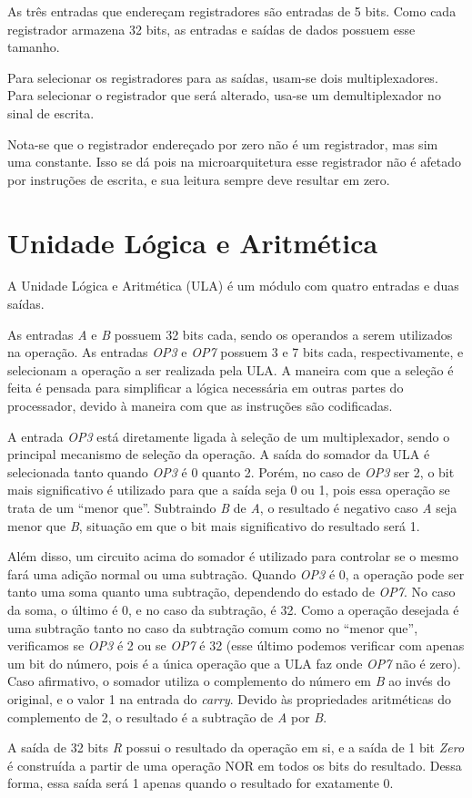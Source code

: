\documentclass[twocolumn]{article}
\newcommand{\circuit}[1]{}
\begin{document}
As três entradas que endereçam registradores são entradas de 5 bits. Como cada
registrador armazena 32 bits, as entradas e saídas de dados possuem esse
tamanho.

Para selecionar os registradores para as saídas, usam-se dois
multiplexadores. Para selecionar o registrador que será alterado, usa-se um
demultiplexador no sinal de escrita.

Nota-se que o registrador endereçado por zero não é um registrador, mas sim uma
constante. Isso se dá pois na microarquitetura esse registrador não é afetado
por instruções de escrita, e sua leitura sempre deve resultar em zero.

\section{Unidade Lógica e Aritmética}

A Unidade Lógica e Aritmética (ULA) é um módulo com quatro entradas e duas
saídas.

\circuit{alu}

As entradas \textit{A} e \textit{B} possuem 32 bits cada, sendo os operandos a
serem utilizados na operação. As entradas \textit{OP3} e \textit{OP7} possuem 3
e 7 bits cada, respectivamente, e selecionam a operação a ser realizada pela
ULA. A maneira com que a seleção é feita é pensada para simplificar a lógica
necessária em outras partes do processador, devido à maneira com que as
instruções são codificadas.

A entrada \textit{OP3} está diretamente ligada à seleção de um multiplexador,
sendo o principal mecanismo de seleção da operação. A saída do somador da ULA é
selecionada tanto quando \textit{OP3} é 0 quanto 2. Porém, no caso de
\textit{OP3} ser 2, o bit mais significativo é utilizado para que a saída seja 0
ou 1, pois essa operação se trata de um ``menor que''. Subtraindo \textit{B} de
\textit{A}, o resultado é negativo caso \textit{A} seja menor que \textit{B},
situação em que o bit mais significativo do resultado será 1.

Além disso, um circuito acima do somador é utilizado para controlar se o mesmo
fará uma adição normal ou uma subtração. Quando \textit{OP3} é 0, a operação
pode ser tanto uma soma quanto uma subtração, dependendo do estado de
\textit{OP7}. No caso da soma, o último é 0, e no caso da subtração, é 32. Como
a operação desejada é uma subtração tanto no caso da subtração comum como no
``menor que'', verificamos se \textit{OP3} é 2 ou se \textit{OP7} é 32 (esse
último podemos verificar com apenas um bit do número, pois é a única operação
que a ULA faz onde \textit{OP7} não é zero). Caso afirmativo, o somador utiliza
o complemento do número em \textit{B} ao invés do original, e o valor 1 na
entrada do \textit{carry}. Devido às propriedades aritméticas do complemento de
2\cite{cornell-notes}, o resultado é a subtração de \textit{A} por \textit{B}.

A saída de 32 bits \textit{R} possui o resultado da operação em si, e a saída de
1 bit \textit{Zero} é construída a partir de uma operação NOR em todos os bits
do resultado. Dessa forma, essa saída será 1 apenas quando o resultado for
exatamente 0.

{}

\end{document}
